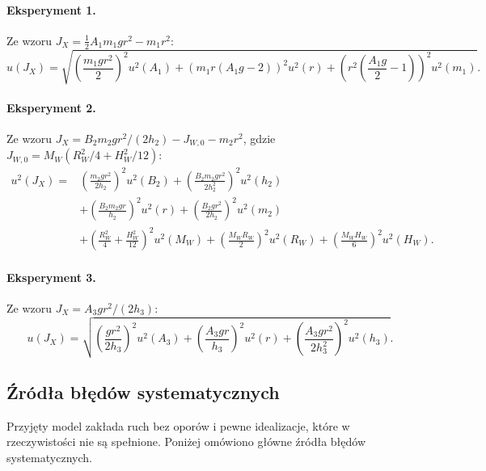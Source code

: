 \documentclass[12pt, a4paper]{article}
\begin{document}
\paragraph{Eksperyment 1.} Ze wzoru $J_X = \tfrac{1}{2}A_1 m_1 g r^2 - m_1 r^2$:
\[
    u(J_X) = \sqrt{
        {\left(\frac{m_1 g r^2}{2}\right)}^2 u^2(A_1)
        + {\left(m_1 r\!\left(A_1 g - 2\right)\right)}^2 u^2(r)
        + {\left(r^2\!\left(\frac{A_1 g}{2} - 1\right)\right)}^2 u^2(m_1)
    }.
\]

\paragraph{Eksperyment 2.} Ze wzoru $J_X = B_2 m_2 g r^2/(2h_2) - J_{W,0} - m_2 r^2$, gdzie $J_{W,0} = M_W(R_W^2/4 + H_W^2/12)$:
\begin{align*}
    u^2(J_X) =
        &{\left(\frac{m_2 g r^2}{2h_2}\right)}^2\!u^2(B_2)
        +{\left(\frac{B_2 m_2 g r^2}{2h_2^2}\right)}^2\!u^2(h_2) \\
        &+{\left(\frac{B_2 m_2 g r}{h_2}\right)}^2\!u^2(r)
        +{\left(\frac{B_2 g r^2}{2h_2}\right)}^2\!u^2(m_2) \\
        &+{\left(\frac{R_W^2}{4} + \frac{H_W^2}{12}\right)}^2\!u^2(M_W)
        +{\left(\frac{M_W R_W}{2}\right)}^2\!u^2(R_W)
        +{\left(\frac{M_W H_W}{6}\right)}^2\!u^2(H_W).
\end{align*}

\paragraph{Eksperyment 3.} Ze wzoru $J_X = A_3 g r^2 / (2h_3)$:
\[
    u(J_X) = \sqrt{
        {\left(\frac{g r^2}{2h_3}\right)}^2 u^2(A_3)
        + {\left(\frac{A_3 g r}{h_3}\right)}^2 u^2(r)
        + {\left(\frac{A_3 g r^2}{2h_3^2}\right)}^2 u^2(h_3)
    }.
\]

\subsection{Źródła błędów systematycznych}

Przyjęty model zakłada ruch bez oporów i pewne idealizacje, które w rzeczywistości nie są spełnione. Poniżej omówiono główne źródła błędów systematycznych.
\end{document}
